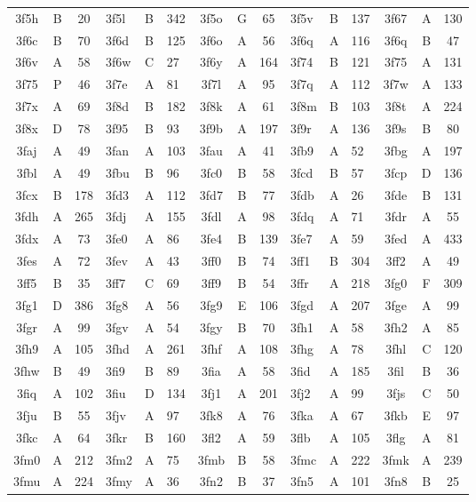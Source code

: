 \begin{longtable}{|c|c|c| a|a|a| c|c|c| a|a|a| c|c|c|}
3f5h & B & 20 & 3f5l & B & 342 & 3f5o & G & 65 & 3f5v & B & 137 & 3f67 & A & 130\\
3f6c & B & 70 & 3f6d & B & 125 & 3f6o & A & 56 & 3f6q & A & 116 & 3f6q & B & 47\\
3f6v & A & 58 & 3f6w & C & 27 & 3f6y & A & 164 & 3f74 & B & 121 & 3f75 & A & 131\\
3f75 & P & 46 & 3f7e & A & 81 & 3f7l & A & 95 & 3f7q & A & 112 & 3f7w & A & 133\\
3f7x & A & 69 & 3f8d & B & 182 & 3f8k & A & 61 & 3f8m & B & 103 & 3f8t & A & 224\\
3f8x & D & 78 & 3f95 & B & 93 & 3f9b & A & 197 & 3f9r & A & 136 & 3f9s & B & 80\\
3faj & A & 49 & 3fan & A & 103 & 3fau & A & 41 & 3fb9 & A & 52 & 3fbg & A & 197\\
3fbl & A & 49 & 3fbu & B & 96 & 3fc0 & B & 58 & 3fcd & B & 57 & 3fcp & D & 136\\
3fcx & B & 178 & 3fd3 & A & 112 & 3fd7 & B & 77 & 3fdb & A & 26 & 3fde & B & 131\\
3fdh & A & 265 & 3fdj & A & 155 & 3fdl & A & 98 & 3fdq & A & 71 & 3fdr & A & 55\\
3fdx & A & 73 & 3fe0 & A & 86 & 3fe4 & B & 139 & 3fe7 & A & 59 & 3fed & A & 433\\
3fes & A & 72 & 3fev & A & 43 & 3ff0 & B & 74 & 3ff1 & B & 304 & 3ff2 & A & 49\\
3ff5 & B & 35 & 3ff7 & C & 69 & 3ff9 & B & 54 & 3ffr & A & 218 & 3fg0 & F & 309\\
3fg1 & D & 386 & 3fg8 & A & 56 & 3fg9 & E & 106 & 3fgd & A & 207 & 3fge & A & 99\\
3fgr & A & 99 & 3fgv & A & 54 & 3fgy & B & 70 & 3fh1 & A & 58 & 3fh2 & A & 85\\
3fh9 & A & 105 & 3fhd & A & 261 & 3fhf & A & 108 & 3fhg & A & 78 & 3fhl & C & 120\\
3fhw & B & 49 & 3fi9 & B & 89 & 3fia & A & 58 & 3fid & A & 185 & 3fil & B & 36\\
3fiq & A & 102 & 3fiu & D & 134 & 3fj1 & A & 201 & 3fj2 & A & 99 & 3fjs & C & 50\\
3fju & B & 55 & 3fjv & A & 97 & 3fk8 & A & 76 & 3fka & A & 67 & 3fkb & E & 97\\
3fkc & A & 64 & 3fkr & B & 160 & 3fl2 & A & 59 & 3flb & A & 105 & 3flg & A & 81\\
3fm0 & A & 212 & 3fm2 & A & 75 & 3fmb & B & 58 & 3fmc & A & 222 & 3fmk & A & 239\\
3fmu & A & 224 & 3fmy & A & 36 & 3fn2 & B & 37 & 3fn5 & A & 101 & 3fn8 & B & 25\\

\end{longtable}

